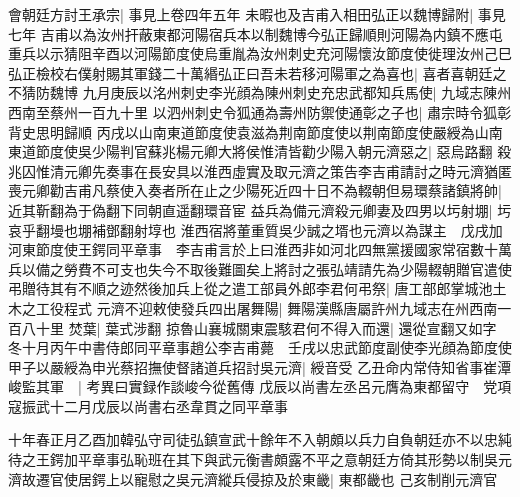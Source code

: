 會朝廷方討王承宗|{
	事見上卷四年五年}
未暇也及吉甫入相田弘正以魏博歸附|{
	事見七年}
吉甫以為汝州扞蔽東都河陽宿兵本以制魏博今弘正歸順則河陽為内鎮不應屯重兵以示猜阻辛酉以河陽節度使烏重胤為汝州刺史充河陽懷汝節度使徙理汝州己巳弘正檢校右僕射賜其軍錢二十萬緡弘正曰吾未若移河陽軍之為喜也|{
	喜者喜朝廷之不猜防魏博}
九月庚辰以洺州刺史李光顔為陳州刺史充忠武都知兵馬使|{
	九域志陳州西南至蔡州一百九十里}
以泗州刺史令狐通為壽州防禦使通彰之子也|{
	肅宗時令狐彰背史思明歸順}
丙戌以山南東道節度使袁滋為荆南節度使以荆南節度使嚴綬為山南東道節度使吳少陽判官蘇兆楊元卿大將侯惟清皆勸少陽入朝元濟惡之|{
	惡烏路翻}
殺兆囚惟清元卿先奏事在長安具以淮西虛實及取元濟之策告李吉甫請討之時元濟猶匿喪元卿勸吉甫凡蔡使入奏者所在止之少陽死近四十日不為輟朝但易環蔡諸鎮將帥|{
	近其靳翻為于偽翻下同朝直遥翻環音宦}
益兵為備元濟殺元卿妻及四男以圬射堋|{
	圬哀乎翻墁也堋補鄧翻射埻也}
淮西宿將董重質吳少誠之壻也元濟以為謀主　戊戌加河東節度使王鍔同平章事　李吉甫言於上曰淮西非如河北四無黨援國家常宿數十萬兵以備之勞費不可支也失今不取後難圖矣上將討之張弘靖請先為少陽輟朝贈官遣使弔贈待其有不順之迹然後加兵上從之遣工部員外郎李君何弔祭|{
	唐工部郎掌城池土木之工役程式}
元濟不迎敕使發兵四出屠舞陽|{
	舞陽漢縣唐屬許州九域志在州西南一百八十里}
焚葉|{
	葉式涉翻}
掠魯山襄城關東震駭君何不得入而還|{
	還從宣翻又如字}
冬十月丙午中書侍郎同平章事趙公李吉甫薨　壬戌以忠武節度副使李光顔為節度使甲子以嚴綬為申光蔡招撫使督諸道兵招討吳元濟|{
	綬音受}
乙丑命内常侍知省事崔潭峻監其軍　|{
	考異曰實録作談峻今從舊傳}
戊辰以尚書左丞呂元膺為東都留守　党項寇振武十二月戊辰以尚書右丞韋貫之同平章事

十年春正月乙酉加韓弘守司徒弘鎮宣武十餘年不入朝頗以兵力自負朝廷亦不以忠純待之王鍔加平章事弘恥班在其下與武元衡書頗露不平之意朝廷方倚其形勢以制吳元濟故遷官使居鍔上以寵慰之吳元濟縱兵侵掠及於東畿|{
	東都畿也}
己亥制削元濟官

